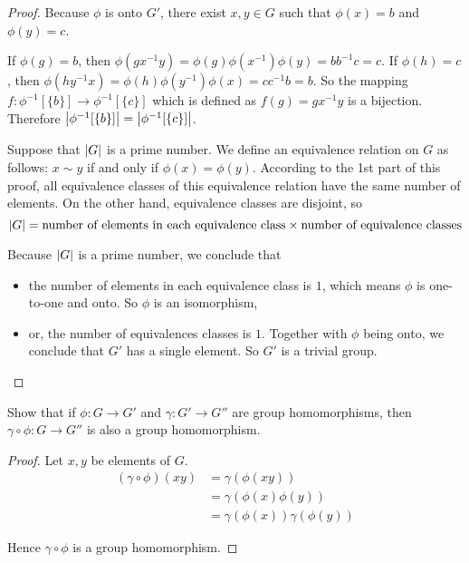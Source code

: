 \begin{proof}
    Because $\phi$ is onto $G'$, there exist $x, y\in G$ such that $\phi(x) = b$ and $\phi(y) = c$.

    If $\phi(g) = b$, then $\phi(gx^{-1}y) = \phi(g)\phi(x^{-1})\phi(y) = bb^{-1}c = c$. If $\phi(h) = c$, then $\phi(hy^{-1}x) = \phi(h)\phi(y^{-1})\phi(x) = cc^{-1}b = b$. So the mapping $f: \phi^{-1}[\{b\}] \to \phi^{-1}[\{c\}]$ which is defined as $f(g) = gx^{-1}y$ is a bijection. Therefore $\left\vert{\phi^{-1}[\{b\}]}\right\vert = \left\vert{\phi^{-1}[\{c\}]}\right\vert$.

    Suppose that $\left\vert{G}\right\vert$ is a prime number. We define an equivalence relation on $G$ as follows: $x\sim y$ if and only if $\phi(x) = \phi(y)$. According to the 1st part of this proof, all equivalence classes of this equivalence relation have the same number of elements. On the other hand, equivalence classes are disjoint, so
    \[
        \left\vert{G}\right\vert = \text{number of elements in each equivalence class} \times \text{number of equivalence classes}
    \]

    Because $\left\vert{G}\right\vert$ is a prime number, we conclude that
    \begin{itemize}
        \item the number of elements in each equivalence class is $1$, which means $\phi$ is one-to-one and onto. So $\phi$ is an isomorphism,
        \item or, the number of equivalences classes is $1$. Together with $\phi$ being onto, we conclude that $G'$ has a single element. So $G'$ is a trivial group.
    \end{itemize}
\end{proof}

\begin{exercise}
    Show that if $\phi: G\to G'$ and $\gamma: G'\to G''$ are group homomorphisms, then $\gamma\circ\phi: G\to G''$ is also a group homomorphism.
\end{exercise}

\begin{proof}
    Let $x, y$ be elements of $G$.
    \begin{align*}
        (\gamma\circ\phi)(xy) & = \gamma(\phi(xy))               \\
                              & = \gamma(\phi(x)\phi(y))         \\
                              & = \gamma(\phi(x))\gamma(\phi(y))
    \end{align*}

    Hence $\gamma\circ\phi$ is a group homomorphism.
\end{proof}

